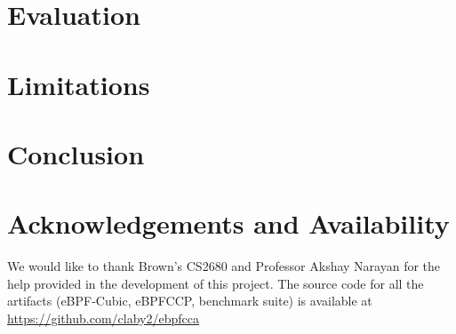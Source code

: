 \section{Evaluation}


\section{Limitations}


\section{Conclusion}


\section{Acknowledgements and Availability}

We would like to thank Brown's CS2680 and Professor Akshay Narayan for the help provided in the development of this project. The source code for all the artifacts (eBPF-Cubic, eBPFCCP, benchmark suite) is available at \url{https://github.com/claby2/ebpfcca}






